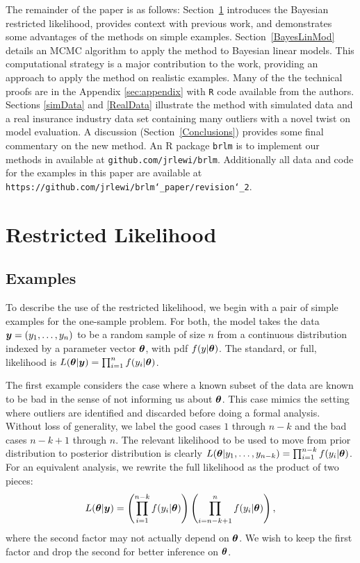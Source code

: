 \documentclass[ba]{imsart}
\def\bth{\mbox{\boldmath $\theta$}}
\newcommand{\by}{\mbox{\boldmath $y$}}
\newcommand{\response}[1]{{\color{blue}#1}}
\begin{document}
The remainder of the paper is as follows: Section~\ref{restrictedlikelihood} introduces the Bayesian restricted likelihood, provides context with previous work, and demonstrates some advantages of the methods on simple examples. Section~\ref{BayesLinMod} details an MCMC algorithm to apply the method to Bayesian linear models. This computational strategy is a major contribution to the work, providing an approach to apply the method on realistic examples. Many of the the technical proofs are in the Appendix \ref{sec:appendix} with \texttt{R} code available from the authors. Sections \ref{simData} and \ref{RealData} illustrate the method with simulated data and a real insurance industry data set containing many outliers with a novel twist on model evaluation. A discussion (Section~\ref{Conclusions}) provides some final commentary on the new method. \response{ An R package \texttt{brlm} is to implement our methods in available at \texttt{github.com/jrlewi/brlm}. Additionally all data and code for the examples in this paper are available at \texttt{https://github.com/jrlewi/brlm\char`_paper/revision\char`_2}.}

\section{Restricted Likelihood}
\label{restrictedlikelihood}

\subsection{Examples}
To describe the use of the restricted likelihood, 
we begin with a pair of simple examples for the one-sample problem.  For both, the model takes the data $\by=(y_1,\ldots,y_n)$ to be a random sample
of size $n$ from a continuous distribution indexed by a parameter
vector $\bth$, with pdf $f(y| \bth)$.  The standard, or full,
likelihood is $L(\bth | \by) = \prod_{i=1}^n f(y_i | \bth)$.  

The first example considers the case where a known subset of the data are known to be 
bad in the sense of not informing us about $\bth$.  This case mimics the setting where outliers are identified and discarded before doing a formal analysis.  Without loss of generality, we label the good cases $1$ through $n-k$ and the bad cases $n-k+1$ through $n$.  The relevant likelihood to be used to move from prior distribution to posterior distribution is clearly $L(\bth | y_1, \ldots, y_{n-k}) = \prod_{i=1}^{n-k} f(y_i | \bth)$.  For an equivalent analysis, we rewrite the full likelihood as the product of two pieces:
\begin{eqnarray}
\label{OutlyingCases}
L(\bth | \by)  
= \left( \prod_{i=1}^{n-k} f(y_i | \bth) \right) \left( \prod_{i=n-k+1}^{n} f(y_i | \bth) \right), 
\end{eqnarray}
where the second factor may not actually depend on $\bth$. We wish to keep the first factor and drop the second for better inference on $\bth$.
\end{document}
